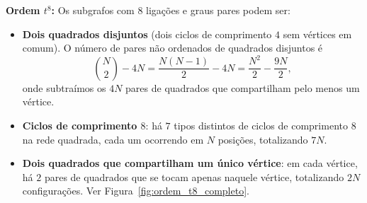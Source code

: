 \documentclass[11pt,a4paper]{article}
\begin{document}
\medskip
\noindent\textbf{Ordem $t^8$:} Os subgrafos com $8$ ligações e graus pares podem ser:
%
\begin{itemize}
    \item \textbf{Dois quadrados disjuntos} (dois ciclos de comprimento $4$ sem
    vértices em comum). O número de pares não ordenados de quadrados disjuntos é
    \begin{equation}
        \binom{N}{2} - 4N
        = \frac{N(N-1)}{2} - 4N
        = \frac{N^2}{2} - \frac{9N}{2},
    \end{equation}
    onde subtraímos os $4N$ pares de quadrados que compartilham pelo menos um
    vértice.
    \item \textbf{Ciclos de comprimento $8$}: há $7$ tipos distintos de ciclos de
    comprimento $8$ na rede quadrada, cada um ocorrendo em $N$ posições,
    totalizando $7N$.
    \item \textbf{Dois quadrados que compartilham um único vértice}: em cada
    vértice, há $2$ pares de quadrados que se tocam apenas naquele vértice,
    totalizando $2N$ configurações. Ver Figura~\ref{fig:ordem_t8_completo}.
\end{itemize}
%
\end{document}
